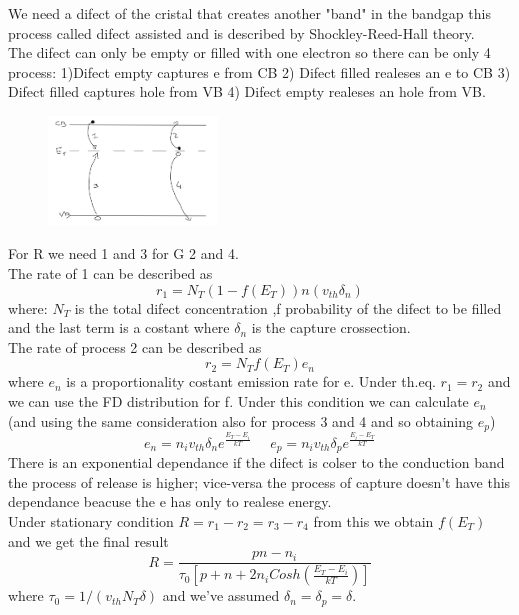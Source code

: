 We need a difect of the cristal that creates another "band" in the bandgap this process called difect assisted and is described by Shockley-Reed-Hall theory.\\
The difect can only be empty or filled with one electron so there can be only 4 process: 1)Difect empty captures e from CB   2) Difect filled realeses an e to CB 3) Difect filled captures hole from VB 4) Difect empty realeses an hole from VB.

\begin{figure}
\includegraphics[width=0.4\textwidth]{srhp2.png}
\end{figure}

For R we need 1 and 3 for G 2 and 4.\\
The rate of 1 can be described as 
\begin{equation}
r_1=N_T(1-f(E_T))n(v_{th} \delta_n)
\end{equation}
where: $N_T$ is the total difect concentration ,f probability of the difect to be filled and the last term is a costant where $\delta_n$ is the capture crossection.\\
The rate of process 2 can be described as 
\begin{equation}
r_2=N_Tf(E_T)e_n
\end{equation}
where $e_n$ is a proportionality costant emission rate for e.
Under th.eq. $r_1=r_2$ and we can use the FD distribution for f. Under this condition we can calculate $e_n$ (and using the same consideration also for process 3 and 4 and so obtaining $e_p$)
\begin{equation}
e_n=n_iv_{th}\delta_ne^{\frac{E_T-E_i}{kT}} \ \ \ \ \ \ e_p=n_iv_{th}\delta_pe^{\frac{E_i-E_T}{kT}}
\end{equation}
There is an exponential dependance if the difect is colser to the conduction band the process of release is higher; vice-versa the process of capture doesn't have this dependance beacuse the e has only to realese energy.\\
Under stationary condition $R=r_1-r_2=r_3-r_4$ from this we obtain $f(E_T)$ and we get the final result 
\begin{equation}
R=\frac{pn-n_i}{\tau_0\left[p+n+2n_iCosh(\frac{E_T-E_i}{kT})\right]}
\end{equation}
where $\tau_0=1/(v_{th}N_T\delta)$ and we've assumed $\delta_n=\delta_p=\delta$.\\

